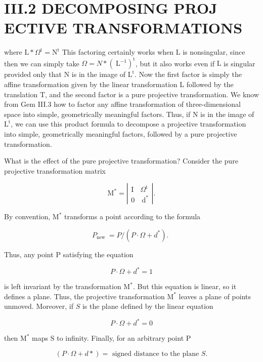\section{III.2 DECOMPOSING PROJ ECTIVE TRANSFORMATIONS}
where $\mathrm{L} * \Omega^{\mathrm{t}}=\mathrm{N}^{\mathrm{t}}$ This factoring certainly works when $\mathrm{L}$ is nonsingular, since then we can simply take $\Omega=N *\left(\mathrm{~L}^{-1}\right)^{\mathrm{t}}$, but it also works even if $\mathrm{L}$ is singular provided only that $\mathrm{N}$ is in the image of $\mathrm{L}^{\mathrm{t}}$. Now the first factor is simply the affine transformation given by the linear transformation L followed by the translation $\mathrm{T}$, and the second factor is a pure projective transformation. We know from Gem III.3 how to factor any affine transformation of three-dimensional space into simple, geometrically meaningful factors. Thus, if $\mathrm{N}$ is in the image of $\mathrm{L}^{\mathrm{t}}$, we can use this product formula to decompose a projective transformation into simple, geometrically meaningful factors, followed by a pure projective transformation.

What is the effect of the pure projective transformation? Consider the pure projective transformation matrix

$$
\mathrm{M}^{*}=\left|\begin{array}{cc}
\mathrm{I} & \Omega^{\mathrm{t}} \\
0 & \mathrm{~d}^{*}
\end{array}\right| .
$$

By convention, $\mathrm{M}^{*}$ transforms a point according to the formula

$$
P_{\text {new }}=P /\left(P \cdot \Omega+d^{*}\right) \text {. }
$$

Thus, any point $\mathrm{P}$ satisfying the equation

$$
P \cdot \Omega+d^{*}=1
$$

is left invariant by the transformation $\mathrm{M}^{*}$. But this equation is linear, so it defines a plane. Thus, the projective transformation $\mathrm{M}^{*}$ leaves a plane of points unmoved. Moreover, if $S$ is the plane defined by the linear equation

$$
P \cdot \Omega+d^{*}=0
$$

then $\mathrm{M}^{*}$ maps $\mathrm{S}$ to infinity. Finally, for an arbitrary point $\mathrm{P}$

$$
(P \cdot \Omega+d *)=\text { signed distance to the plane } S .
$$

